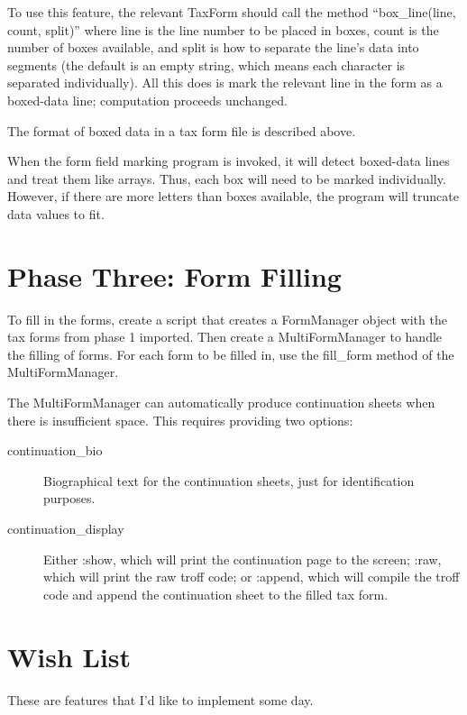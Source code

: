 \documentclass[12pt]{article}
\begin{document}
To use this feature, the relevant TaxForm should call the method
``box\_line(line, count, split)'' where line is the line number to be placed
in boxes, count is the number of boxes available, and split is how to separate
the line's data into segments (the default is an empty string, which means each
character is separated individually). All this does is mark the relevant line in
the form as a boxed-data line; computation proceeds unchanged.

The format of boxed data in a tax form file is described above.

When the form field marking program is invoked, it will detect boxed-data lines
and treat them like arrays. Thus, each box will need to be marked individually.
However, if there are more letters than boxes available, the program will
truncate data values to fit.






\section{Phase Three: Form Filling}

To fill in the forms, create a script that creates a FormManager object with the
tax forms from phase 1 imported. Then create a MultiFormManager to handle the
filling of forms. For each form to be filled in, use the fill\_form method of
the MultiFormManager.

The MultiFormManager can automatically produce continuation sheets when there is
insufficient space. This requires providing two options:
\begin{description}
\item[continuation\_bio] Biographical text for the continuation sheets, just for
identification purposes.
\item[continuation\_display] Either :show, which will print the continuation
page to the screen; :raw, which will print the raw troff code; or :append, which
will compile the troff code and append the continuation sheet to the filled tax
form.
\end{description}





\section{Wish List}

These are features that I'd like to implement some day.
\end{document}
